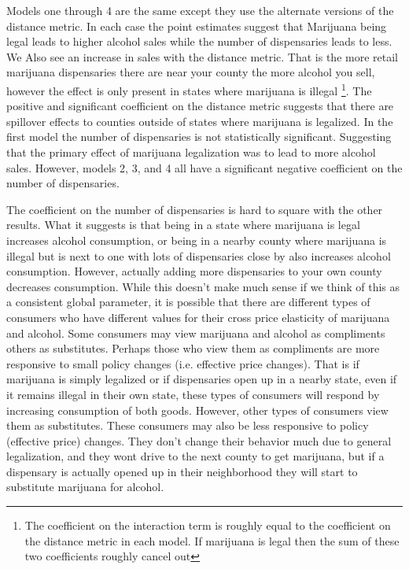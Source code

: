\documentclass[11pt]{article}
\begin{document}
Models one through 4 are the same except they use the alternate versions of the distance metric. In each case the point estimates suggest that Marijuana being legal leads to higher alcohol sales while the number of dispensaries leads to less. We Also see an increase in sales with the distance metric. That is the more retail marijuana dispensaries there are near your county the more alcohol you sell, however the effect is only present in states where marijuana is illegal \footnote{The coefficient on the interaction term is roughly equal to the coefficient on the distance metric in each model. If marijuana is legal then the sum of these two coefficients roughly cancel out}. The positive and significant coefficient on the distance metric suggests that there are spillover effects to counties outside of states where marijuana is legalized. In the first model the number of dispensaries is not statistically significant. Suggesting that the primary effect of marijuana legalization was to lead to more alcohol sales. However, models 2, 3, and 4 all have a significant negative coefficient on the number of dispensaries. \par 

The coefficient on the number of dispensaries is hard to square with the other results. What it suggests is that being in a state where marijuana is legal increases alcohol consumption, or being in a nearby county where marijuana is illegal but is next to one with lots of dispensaries close by also increases alcohol consumption. However, actually adding more dispensaries to your own county decreases consumption. While this doesn't make much sense if we think of this as a consistent global parameter, it is possible that there are different types of consumers who have different values for their cross price elasticity of marijuana and alcohol. Some consumers may view marijuana and alcohol as compliments others as substitutes. Perhaps those who view them as compliments are more responsive to small policy changes (i.e. effective price changes). That is if marijuana is simply legalized or if dispensaries open up in a nearby state, even if it remains illegal in their own state, these types of consumers will respond by increasing consumption of both goods. However, other types of consumers view them as substitutes. These consumers may also be less responsive to policy (effective price) changes. They don't change their behavior much due to general legalization, and they wont drive to the next county to get marijuana, but if a dispensary is actually opened up in their neighborhood they will start to substitute marijuana for alcohol. \par
\end{document}

